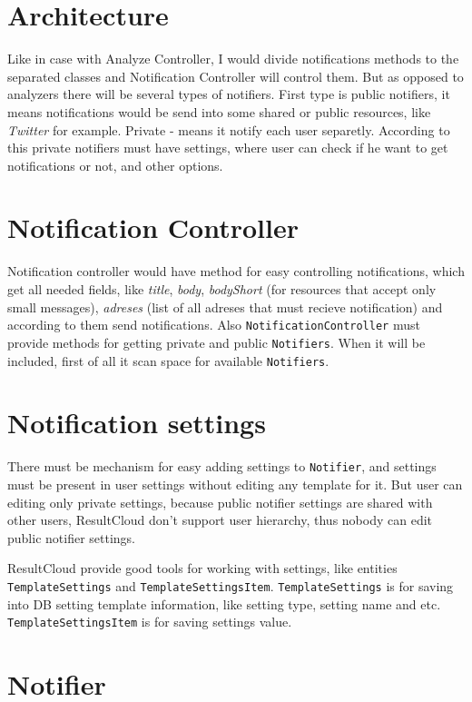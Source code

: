 \section{Architecture}

Like in case with Analyze Controller, I would divide notifications methods to the separated classes and Notification Controller will control them. But as opposed to analyzers there will be several types of notifiers. First type is public notifiers, it means notifications would be send into some shared or public resources, like \emph{Twitter} for example. Private - means it notify each user separetly. According to this private notifiers must have settings, where user can check if he want to get notifications or not, and other options.

\section{Notification Controller}

Notification controller would have method for easy controlling notifications, which get all needed fields, like \emph{title}, \emph{body}, \emph{bodyShort} (for resources that accept only small messages), \emph{adreses} (list of all adreses that must recieve notification) and according to them send notifications. Also \texttt{NotificationController} must provide methods for getting private and public \texttt{Notifiers}. When it will be included, first of all it scan space for available \texttt{Notifiers}.

\section{Notification settings}

There must be mechanism for easy adding settings to \texttt{Notifier}, and settings must be present in user settings without editing any template for it. But user can editing only private settings, because public notifier settings are shared with other users, ResultCloud don't support user hierarchy, thus nobody can edit public notifier settings.

ResultCloud provide good tools for working with settings, like entities \texttt{TemplateSettings} and \texttt{TemplateSettingsItem}. \texttt{TemplateSettings} is for saving into DB setting template information, like setting type, setting name and etc. \texttt{TemplateSettingsItem} is for saving settings value.

\section{Notifier}

